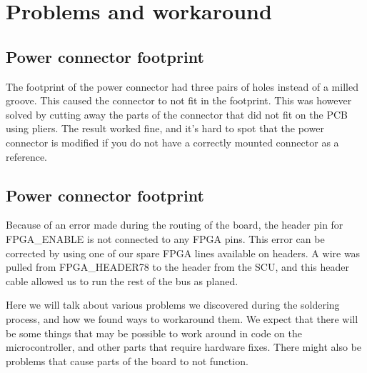 \section {Problems and workaround}

\subsection{ Power connector footprint }

The footprint of the power connector had three pairs of holes instead of a milled groove.
This caused the connector to not fit in the footprint.
This was however solved by cutting away the parts of the connector that did not fit on the PCB using pliers.
The result worked fine, and it's hard to spot that the power connector is modified if you do not have a correctly mounted connector as a reference.

\subsection{ Power connector footprint }

Because of an error made during the routing of the board, the header pin for FPGA_ENABLE is not connected to any FPGA pins.
This error can be corrected by using one of our spare FPGA lines available on headers.
A wire was pulled from FPGA_HEADER78 to the header from the SCU, and this header cable allowed us to run the rest of the bus as planed.



Here we will talk about various problems we discovered during the soldering process, and how we found ways to workaround them.
We expect that there will be some things that may be possible to work around in code on the microcontroller, and other parts that require hardware fixes.
There might also be problems that cause parts of the board to not function.
